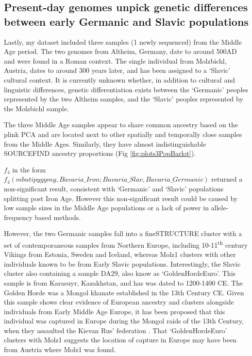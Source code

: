\subsection{Present-day genomes unpick genetic differences between early Germanic and Slavic populations}

Lastly, my dataset included three samples (1 newly sequenced) from the Middle Age period. The two genomes from Altheim, Germany, date to around 500AD and were found in a Roman context. The single individual from Molzbichl, Austria, dates to around 300 years later, and has been assigned to a `Slavic' cultural context. It is currently unknown whether, in addition to cultural and linguistic differences, genetic differentiation exists between the `Germanic’ peoples represented by the two Altheim samples, and the `Slavic’ peoples represented by the Molzbichl sample.

The three Middle Age samples appear to share common ancestry based on the plink PCA and are located next to other spatially and temporally close samples from the Middle Ages. Similarly, they have almost indistinguishable SOURCEFIND ancestry proportions (Fig \ref{fig:plots3PopBarlot}).

$f_{4}$ in the form $f_{4}(mbutipygymy, Bavaria\_Iron; Bavaria\_Slav, Bavaria\_Germanic)$ returned a non-significant result, consistent with `Germanic' and `Slavic' populations splitting post Iron Age. However this non-significant result could be caused by low sample sizes in the Middle Age populations or a lack of power in allele-frequency based methods.

However, the two Germanic samples fall into a fineSTRUCTURE cluster with a set of contemporaneous samples from Northern Europe, including 10-11\textsuperscript{th} century Vikings from Estonia, Sweden and Iceland, whereas Molz1 clusters with other individuals known to be from Early Slavic populations. Interestingly, the Slavic cluster also containing a sample DA29, also know as `GoldenHordeEuro'. This sample is from Karasuyr, Kazakhstan, and has was dated to 1200-1400 CE. The Golden Horde was a Mongol khanate established in the 13th Century CE. Given this sample shows clear evidence of European ancestry and clusters alongside individuals from Early Middle Age Europe, it has been proposed that this individual was captured in Europe during the Mongol raids of the 13th Century, when they assaulted the Kievan Rus' federation \cite{de2018137}. That `GoldenHordeEuro' clusters with Molz1 suggests the location of capture in Europe may have been from Austria where Molz1 was found.

